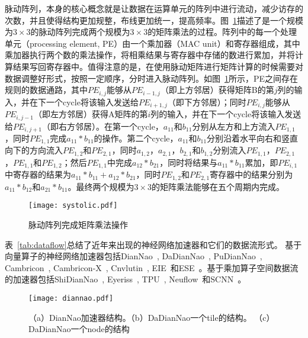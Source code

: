 脉动阵列，本身的核心概念就是让数据在运算单元的阵列中进行流动，减少访存的次数，并且使得结构更加规整，布线更加统一，提高频率。图~\ref{fig:systolic}描述了是一个规模为$3\times 3$的脉动阵列完成两个规模为$3\times 3$的矩阵乘法的过程。阵列中的每一个处理单元（processing element, PE）由一个乘加器（MAC unit）和寄存器组成，其中乘加器执行两个数的乘法操作，将相乘结果与寄存器中存储的数进行累加，并将计算结果写回寄存器中。值得注意的是，在使用脉动矩阵进行矩阵计算的时候需要对数据调整好形式，按照一定顺序，分时进入脉动阵列。如图~\ref{fig:systolic}所示，PE之间存在规则的数据通路，其中$PE_{i,j}$能够从$PE_{i-1,j}$（即上方邻居）获得矩阵B的第$j$列的输入，并在下一个cycle将该输入发送给$PE_{i+1,j}$（即下方邻居）；同时$PE_{i,j}$能够从$PE_{i,j-1}$（即左方邻居）获得A矩阵的第$i$列的输入，并在下一个cycle将该输入发送给$PE_{i,j+1}$（即右方邻居）。在第一个cycle，$a_{11}$和$b_{11}$分别从左方和上方流入$PE_{1,1}$，同时$PE_{1,1}$完成$a_{11}*b_{11}$的操作。第二个cycle，$a_{11}$和$b_{11}$分别沿着水平向右和竖直向下的方向流入$PE_{1,2}$和$PE_{2,1}$，同时$a_{1,2}$，$a_{2,1}$，$b_{2,1}$和$b_{1,2}$分别流入$PE_{1,1}$，$PE_{2,1}$，$PE_{1,1}$和$PE_{1,2}$；然后$PE_{1,1}$中完成$a_{12}*b_{21}$，同时将结果与$a_{11}*b_{11}$累加，即$PE_{i,1}$中寄存器的结果为$a_{11}*b_{11}+a_{12}*b_{21}$，同时$PE_{1,2}$和$PE_{2,1}$寄存器中的结果分别为$a_{11}*b_{12}$和$a_{21}*b_{11}$。最终两个规模为$3\times 3$的矩阵乘法能够在五个周期内完成。

\begin{figure}[t]
  \centering
  \texttt{[image: systolic.pdf]}
  \caption{\footnotesize 脉动阵列完成矩阵乘法操作}
  \label{fig:systolic}
\end{figure}


表~\ref{tab:dataflow}总结了近年来出现的神经网络加速器和它们的数据流形式。
基于向量算子的神经网络加速器包括DianNao~\cite{chen2014diannao}, DaDianNao~\cite{chen2014dadiannao}, PuDianNao~\cite{liu2015pudiannao}, Cambricon~\cite{liu2016cambricon}, Cambricon-X~\cite{zhang2016cambricon}, Cnvlutin~\cite{albericio2016cnvlutin}, EIE~\cite{han2016eie}和ESE~\cite{han2017ese}。基于乘加算子空间数据流的加速器包括ShiDianNao~\cite{du2015shidiannao}, Eyeriss~\cite{chen2017eyeriss}, TPU~\cite{jouppi2017tpu}, Neuflow~\cite{farabet2011neuflow}和SCNN~\cite{angshuman2017scnn}。


\begin{figure}[t]
  \centering
  \texttt{[image: diannao.pdf]}
  \caption{\footnotesize （a）DianNao加速器结构。（b）DaDianNao一个tile的结构。 （c）DaDianNao一个node的结构}
  \label{fig:diannao}
\end{figure}

